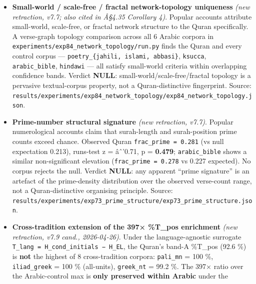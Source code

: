 \documentclass[
]{article}
\begin{document}
\begin{itemize}
  chance alone); \texttt{frac\_significant\ =\ 0.039}, verdict
  \textbf{NULL}. Individual surahs may still exhibit local chiasmic
  patterns --- the retraction is of the \emph{corpus-wide} structural
  signature, not of any specific literary analysis of a single surah.
  Source:
  \texttt{results/experiments/exp86\_ring\_structure/exp86\_ring\_structure.json}.
\item
  \textbf{Small-world / scale-free / fractal network-topology
  uniqueness} \emph{(new retraction, v7.7; also cited in Â§4.35
  Corollary 4)}. Popular accounts attribute small-world, scale-free, or
  fractal network structure to the Quran specifically. A verse-graph
  topology comparison across all 6 Arabic corpora in
  \texttt{experiments/exp84\_network\_topology/run.py} finds the Quran
  and every control corpus ---
  \texttt{poetry\_\{jahili,\ islami,\ abbasi\}}, \texttt{ksucca},
  \texttt{arabic\_bible}, \texttt{hindawi} --- all satisfy small-world
  criteria within overlapping confidence bands. Verdict \textbf{NULL}:
  small-world/scale-free/fractal topology is a pervasive textual-corpus
  property, not a Quran-distinctive fingerprint. Source:
  \texttt{results/experiments/exp84\_network\_topology/exp84\_network\_topology.json}.
\item
  \textbf{Prime-number structural signature} \emph{(new retraction,
  v7.7)}. Popular numerological accounts claim that surah-length and
  surah-position prime counts exceed chance. Observed Quran
  \texttt{frac\_prime\ =\ 0.281} (vs null expectation 0.213), runs-test
  z = âˆ'0.71, p = \textbf{0.479}; \texttt{arabic\_bible} shows a
  similar non-significant elevation (\texttt{frac\_prime\ =\ 0.278} vs
  0.227 expected). No corpus rejects the null. Verdict \textbf{NULL}:
  any apparent ``prime signature'' is an artefact of the prime-density
  distribution over the observed verse-count range, not a
  Quran-distinctive organising principle. Source:
  \texttt{results/experiments/exp73\_prime\_structure/exp73\_prime\_structure.json}.
\item
  \textbf{Cross-tradition extension of the 397× \%T\_pos enrichment}
  \emph{(new retraction, v7.9 cand., 2026-04-26)}. Under the
  language-agnostic surrogate
  \texttt{T\_lang\ =\ H\_cond\_initials\ −\ H\_EL}, the Quran's band-A
  \%T\_pos (92.6 \%) is \textbf{not} the highest of 8 cross-tradition
  corpora: \texttt{pali\_mn} = 100 \%, \texttt{iliad\_greek} = 100 \%
  (all-units), \texttt{greek\_nt} = 99.2 \%. The 397× ratio over the
  Arabic-control max is \textbf{only preserved within Arabic} under the

\end{itemize}
\end{document}
